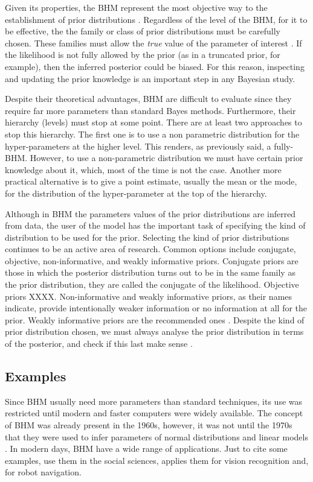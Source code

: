 Given its properties, the BHM represent the most objective way to the establishment of prior distributions \citep{Gelman2006}. Regardless of the level of the BHM, for it to be effective, the the family or class of prior distributions must be carefully chosen. These families must allow the \emph{true} value of the parameter of interest \citep{Morris1983}. If the likelihood is not fully allowed by the prior (as in a truncated prior, for example), then the inferred posterior could be biased. For this reason, inspecting and updating the prior knowledge is an important step in any Bayesian study.

Despite their theoretical advantages, BHM are difficult to evaluate since they require far more parameters than standard Bayes methods.
Furthermore, their hierarchy (levels) must stop at some point. There are at least two approaches to stop this hierarchy. The first one is to use a non parametric distribution for the hyper-parameters at the higher level. This renders, as previously said, a fully-BHM. However, to use a non-parametric distribution we must have certain prior knowledge about it, which, most of the time is not the case. Another more practical alternative is to give a point estimate, usually the mean or the mode, for the distribution of the hyper-parameter at the top of the hierarchy.  

Although in BHM the parameters values of the prior distributions are inferred from data, the user of the model has the important task of specifying the kind of distribution to be used for the prior. Selecting the kind of prior distributions continues to be an active area of research. Common options include conjugate, objective, non-informative, and weakly informative priors. Conjugate priors are those in which the posterior distribution turns out to be in the same family as the prior distribution, they are called the conjugate of the likelihood. 
Objective priors XXXX. Non-informative and weakly informative priors, as their names indicate, provide intentionally weaker information or no information at all for the prior. Weakly informative priors are the recommended ones \cite[see for example the works of][]{Gelman2006,Huang2013,Chung2015}. Despite the kind of prior distribution chosen, we must always analyse the prior distribution in terms of the posterior, and check if this last make sense \cite[][ Chap. 6]{Gelman2006,Gelman2013}.
\subsection{Examples}
Since BHM usually need more parameters than standard techniques, its use was restricted until modern and faster computers were widely available. The concept of BHM was already present in the 1960s, however, it was not until  the 1970s that they were used to infer parameters of normal distributions and linear models \cite[see][for an historical perspective of BHM]{Good1980}. In modern days, BHM have a wide range of applications. Just to cite some examples, \citet{Gelman2007} use them in the social sciences, \citet{Fei2005} applies them for vision recognition and, \citet{Diard2008} for robot navigation.

